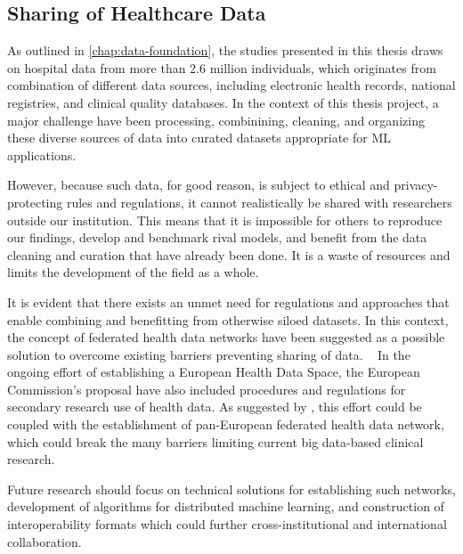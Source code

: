 \subsection{Sharing of Healthcare Data}

As outlined in \cref{chap:data-foundation}, 
the studies presented in this thesis draws on hospital data from 
more than \num{2.6} million individuals, which originates from
combination of different data sources, including
electronic health records, national registries, 
and clinical quality databases.
In the context of this thesis project,
a major challenge have been
processing, combinining, cleaning, and 
organizing these diverse sources of data
into curated datasets appropriate for 
\ac{ML} applications.

However, because such data, for good reason, is subject to ethical 
and privacy-protecting rules and regulations, it cannot realistically 
be shared with researchers outside our institution.
This means that it is impossible for others to reproduce our findings,
develop and benchmark rival models, and benefit from the data cleaning
and curation that have already been done.
It is a waste of resources and limits the development of the field as a whole.

It is evident that 
there exists an unmet need for regulations and approaches that enable 
combining and benefitting from otherwise siloed datasets.
In this context,
the concept of federated health data networks have been 
suggested as a possible solution to overcome existing barriers preventing 
sharing of data.
~\autocite{hallockFederated2021}
In the ongoing effort of establishing a European Health Data Space, 
the European Commission's proposal have also included procedures and
regulations for secondary research use of health data.
As suggested by \textcite{raabFederated2023}, 
this effort could be coupled with the establishment of
pan-European federated health data network, which could break
the many barriers limiting current big data-based clinical research.

Future research should focus on technical solutions for 
establishing such networks, development of algorithms for 
distributed machine learning, and construction of interoperability 
formats which could further cross-institutional and international 
collaboration.

